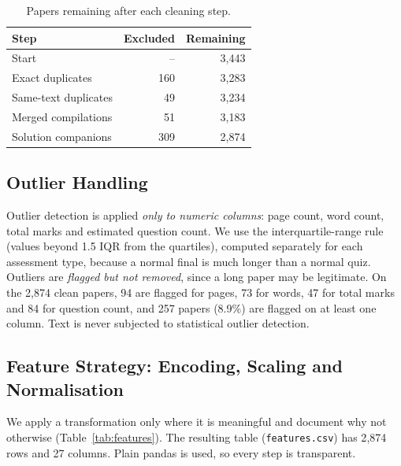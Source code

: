 \documentclass[11pt,a4paper]{article}
\newcommand{\file}[1]{\texttt{#1}}
\begin{document}
\begin{table}[H]
\centering
\caption{Papers remaining after each cleaning step.}
\label{tab:funnel}
\begin{tabular}{lrr}
\toprule
Step & Excluded & Remaining \\
\midrule
Start & -- & 3{,}443 \\
Exact duplicates & 160 & 3{,}283 \\
Same-text duplicates & 49 & 3{,}234 \\
Merged compilations & 51 & 3{,}183 \\
Solution companions & 309 & 2{,}874 \\
\bottomrule
\end{tabular}
\end{table}

\subsection{Outlier Handling}
\label{sec:outliers}
Outlier detection is applied \emph{only to numeric columns}: page count, word count, total marks and estimated question count. We use the interquartile-range rule (values beyond 1.5 IQR from the quartiles), computed separately for each assessment type, because a normal final is much longer than a normal quiz. Outliers are \emph{flagged but not removed}, since a long paper may be legitimate. On the 2{,}874 clean papers, 94 are flagged for pages, 73 for words, 47 for total marks and 84 for question count, and 257 papers (8.9\%) are flagged on at least one column. Text is never subjected to statistical outlier detection.

\subsection{Feature Strategy: Encoding, Scaling and Normalisation}
\label{sec:features}
We apply a transformation only where it is meaningful and document why not otherwise (Table~\ref{tab:features}). The resulting table (\file{features.csv}) has 2{,}874 rows and 27 columns. Plain pandas is used, so every step is transparent.
\end{document}
